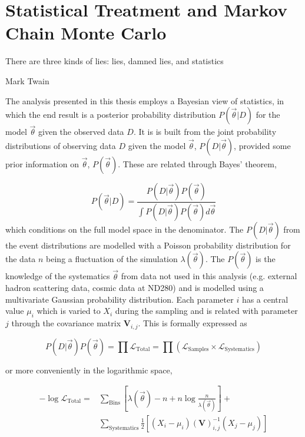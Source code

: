 \chapter{Statistical Treatment and Markov Chain Monte Carlo}
\label{chap:mcmc}

\epigraph{There are three kinds of lies: lies, damned lies, and statistics}{Mark Twain}

The analysis presented in this thesis employs a Bayesian view of statistics, in which the end result is a posterior probability distribution $P(\vec{\theta}|D)$ for the model $\vec{\theta}$ given the observed data $D$. It is is built from the joint probability distributions of observing data $D$ given the model $\vec{\theta}$, $P(D|\vec{\theta})$, provided some prior information on $\vec{\theta}$, $P(\vec{\theta})$. These are related through Bayes' theorem,

\begin{equation}
P(\vec{\theta}|D) = \frac{P(D|\vec{\theta})P(\vec{\theta})}{\int P(D|\vec{\theta})P(\vec{\theta})d\vec{\theta}}
\label{eq:bayes}
\end{equation}
which conditions on the full model space in the denominator. The $P(D|\vec{\theta})$ from the event distributions are modelled with a Poisson probability distribution for the data $n$ being a fluctuation of the simulation $\lambda(\vec{\theta})$. The $P(\vec{\theta})$ is the knowledge of the systematics $\vec{\theta}$ from data not used in this analysis (e.g. external hadron scattering data, cosmic data at ND280) and is modelled using a multivariate Gaussian probability distribution. Each parameter $i$ has a central value $\mu_i$ which is varied to $X_i$ during the sampling and is related with parameter $j$ through the covariance matrix $\mathbf{V}_{i,j}$. This is formally expressed as

\begin{equation}
	P(D|\vec{\theta}) P(\vec{\theta}) = \prod \mathcal{L}_\text{Total} = \prod \left(\mathcal{L}_\text{Samples} \times \mathcal{L}_\text{Systematics}\right)
\end{equation}

or more conveniently in the logarithmic space,

\begin{equation}
\label{eq:test_stat}
\begin{split}
	- \log\mathcal{L}_\text{Total} = &\sum_\text{Bins} \left[ \lambda(\vec{\theta}) - n + n \log \frac{n}{\lambda(\vec{\theta})} \right] + \\
									& \sum_\text{Systematics} \frac{1}{2} \left[ ( X_i - \mu_i ) \left( \boldsymbol{V} \right)^{-1}_{i,j} ( X_j - \mu_j ) \right]
\end{split}
\end{equation}

